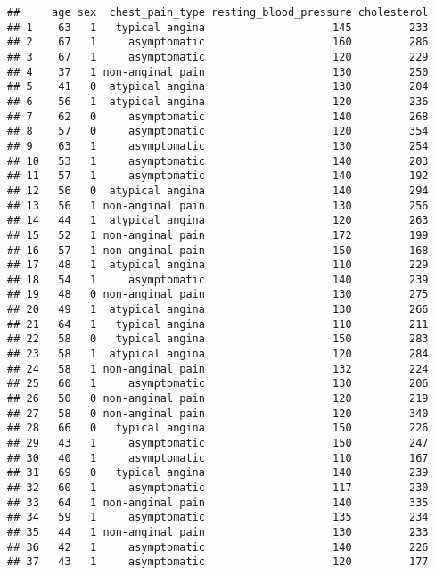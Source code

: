 \documentclass[]{article}
\begin{document}
\begin{verbatim}
##     age sex  chest_pain_type resting_blood_pressure cholesterol
## 1    63   1   typical angina                    145         233
## 2    67   1     asymptomatic                    160         286
## 3    67   1     asymptomatic                    120         229
## 4    37   1 non-anginal pain                    130         250
## 5    41   0  atypical angina                    130         204
## 6    56   1  atypical angina                    120         236
## 7    62   0     asymptomatic                    140         268
## 8    57   0     asymptomatic                    120         354
## 9    63   1     asymptomatic                    130         254
## 10   53   1     asymptomatic                    140         203
## 11   57   1     asymptomatic                    140         192
## 12   56   0  atypical angina                    140         294
## 13   56   1 non-anginal pain                    130         256
## 14   44   1  atypical angina                    120         263
## 15   52   1 non-anginal pain                    172         199
## 16   57   1 non-anginal pain                    150         168
## 17   48   1  atypical angina                    110         229
## 18   54   1     asymptomatic                    140         239
## 19   48   0 non-anginal pain                    130         275
## 20   49   1  atypical angina                    130         266
## 21   64   1   typical angina                    110         211
## 22   58   0   typical angina                    150         283
## 23   58   1  atypical angina                    120         284
## 24   58   1 non-anginal pain                    132         224
## 25   60   1     asymptomatic                    130         206
## 26   50   0 non-anginal pain                    120         219
## 27   58   0 non-anginal pain                    120         340
## 28   66   0   typical angina                    150         226
## 29   43   1     asymptomatic                    150         247
## 30   40   1     asymptomatic                    110         167
## 31   69   0   typical angina                    140         239
## 32   60   1     asymptomatic                    117         230
## 33   64   1 non-anginal pain                    140         335
## 34   59   1     asymptomatic                    135         234
## 35   44   1 non-anginal pain                    130         233
## 36   42   1     asymptomatic                    140         226
## 37   43   1     asymptomatic                    120         177

\end{verbatim}
\end{document}
